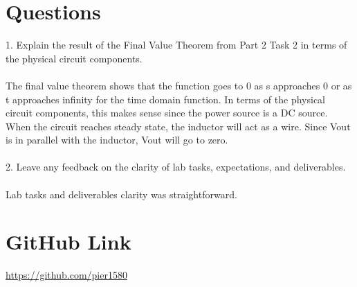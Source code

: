 \section{Questions}
1. Explain the result of the Final Value Theorem from Part 2 Task 2 in terms of the physical circuit components.
\\ \\
The final value theorem shows that the function goes to 0 as s approaches 0 or as t approaches infinity for the time domain function.  In terms of the physical circuit components, this makes sense since the power source is a DC source.  When the circuit reaches steady state, the inductor will act as a wire.  Since Vout is in parallel with the inductor, Vout will go to zero.
\\ \\
2. Leave any feedback on the clarity of lab tasks, expectations, and deliverables.
\\ \\
Lab tasks and deliverables clarity was straightforward.  

\section{GitHub Link}
\url{https://github.com/pier1580}
